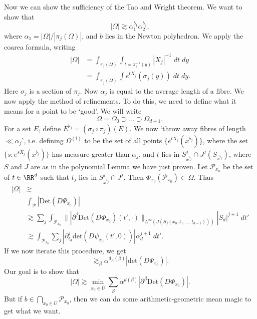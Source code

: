 Now we can show the sufficiency of the Tao and Wright theorem. We want to show that
%
\[ |\Omega| \gtrsim \alpha_1^{b_1} \alpha_2^{b_2}, \]
%
where $\alpha_1 = |\Omega| / |\pi_j(\Omega)|$, and $b$ lies in the Newton polyhedron. We apply the coarea formula, writing
%
\begin{align*}
    |\Omega| &= \int_{\pi_j(\Omega)} \int_{t = \pi_i^{-1}(y)} |X_j|^{-1}\; dt\; dy\\
    &= \int_{\pi_j(\Omega)} \int e^{tX_j}(\sigma_j(y))\; dt\; dy.
\end{align*}
%
Here $\sigma_j$ is a section of $\pi_j$. Now $\alpha_j$ is equal to the average length of a fibre. We now apply the method of refinements. To do this, we need to define what it means for a point to be `good'. We will write
%
\[ \Omega = \Omega_0 \supset \dots \supset \Omega_{d+1}, \]
%
For a set $E$, define $E^{\flat_j} = (\sigma_j \circ \pi_j)(E)$. We now `throw away fibres of length $\ll \alpha_j$', i.e. defining $\Omega^{(i)}$ to be the set of all points $\{ e^{tX_j}(x^{\flat_j}) \}$, where the set $\{ s: e^{sX_j}(x^{\flat_j}) \}$ has measure greater than $\alpha_j$, and $t$ lies in $S^j_{x^{\flat_j}} \cap J^j(S_{x^{\flat_j}})$, where $S$ and $J$ are as in the polynomial Lemma we have just proven. Let $\mathcal{P}_{x_0}$ be the set of $t \in \RR^d$ such that $t_j$ lies in $S^j_{x^{\flat_j}} \cap J^j$. Then $\Phi_{x_0}(\mathcal{P}_{x_0}) \subset \Omega$. Thus
%
\begin{align*}
    |\Omega| &\gtrsim\\
    &\int_{\mathcal{P}} | \text{Det}( D \Psi_{x_0} ) |\\
    &\gtrsim \sum_j \int_{\mathcal{P}_{x_0}} \| |\partial^j \text{Det}(D \Phi_{x_0})(t',\cdot) \|_{L^\infty(J(S_j(x_0,t_1,\dots,t_{d-1})))} |S_d|^{j+1}\; dt'\\
    &\gtrsim \int_{\mathcal{P}_{x_0}} \sum_j |\partial_{t_d}^j \text{det}(D \psi_{x_0}(t',0))| \alpha^{j+1}_d\; dt'.
\end{align*}
%
If we now iterate this procedure, we get
%
\[ \gtrsim_\beta \alpha^{d_A(\beta)} |\text{det}(D \Psi_{x_0})|. \]
Our goal is to show that
%
\[ |\Omega| \gtrsim \min_{x_0 \in \overline{U}} \sum_\beta \alpha^{d(\beta)} |\partial^\beta \text{Det}(D \Phi_{x_0})|. \]
%
But if $b \in \bigcap_{x_0 \in U} \mathcal{P}_{x_0}$, then we can do some arithmetic-geometric mean magic to get what we want.


